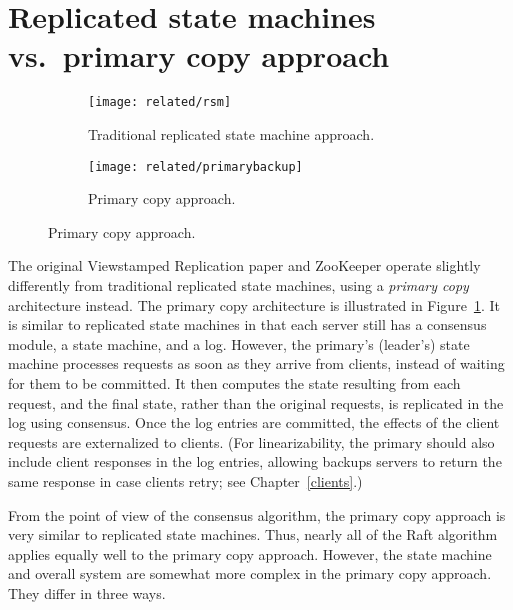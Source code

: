 \section{Replicated state machines vs.\ primary copy approach}
\label{related:rsm}

\begin{figure}
\centering

\begin{subfigure}{\textwidth}
\centering
\texttt{[image: related/rsm]}
\caption{
Traditional replicated state machine approach.
}
\end{subfigure}

\vspace{4ex}

\begin{subfigure}{\textwidth}
\centering
\texttt{[image: related/primarybackup]}
\caption{
Primary copy approach.
}
\end{subfigure}

\label{fig:related:primarybackup}
\end{figure}

The original Viewstamped Replication paper and ZooKeeper operate
slightly differently from traditional replicated
state machines, using a \emph{primary copy} architecture instead.
The primary copy architecture is
illustrated in Figure~\ref{fig:related:primarybackup}. It is similar to
replicated state machines in that each server still has a consensus
module, a state machine, and a log. However, the primary's (leader's) state machine
processes requests as soon as they arrive from clients,
instead of waiting for them to be committed. It then computes
the state resulting from each request, and the final state, rather than
the original requests, is replicated in the log using consensus.
Once the log entries are committed, the effects of the client requests
are externalized to clients.
(For linearizability, the primary should also include client responses in
the log entries, allowing backups servers to return the same response in
case clients retry; see Chapter~\ref{clients}.)

From the point of view of the consensus algorithm, the primary copy
approach is very similar to replicated state machines. Thus, nearly all
of the Raft algorithm applies equally well to the primary copy approach.
However, the state machine and overall system are somewhat more complex
in the primary copy approach. They differ in three ways.

